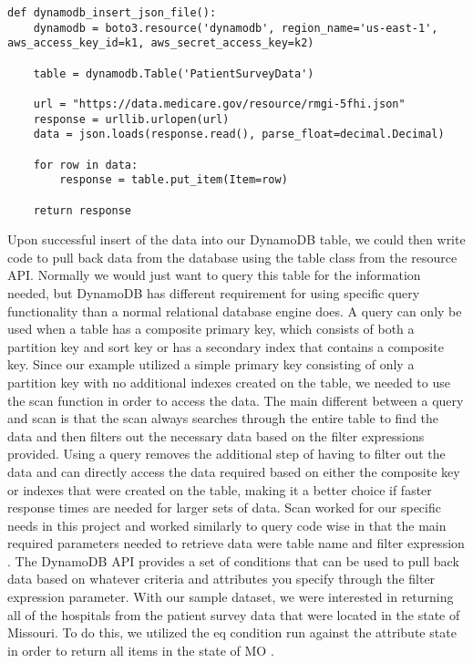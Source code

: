 \begin{verbatim}
def dynamodb_insert_json_file():
    dynamodb = boto3.resource('dynamodb', region_name='us-east-1', aws_access_key_id=k1, aws_secret_access_key=k2)

    table = dynamodb.Table('PatientSurveyData')

    url = "https://data.medicare.gov/resource/rmgi-5fhi.json"
    response = urllib.urlopen(url)
    data = json.loads(response.read(), parse_float=decimal.Decimal)

    for row in data:
        response = table.put_item(Item=row)

    return response
\end{verbatim}

Upon successful insert of the data into our DynamoDB table, we could then write code to pull back data from the database using the table class from the resource API. Normally we would just want to query this table for the information needed, but DynamoDB has different requirement for using specific query functionality than a normal relational database engine does. A query can only be used when a table has a composite primary key, which consists of both a partition key and sort key or has a secondary index that contains a composite key. Since our example utilized a simple primary key consisting of only a partition key with no additional indexes created on the table, we needed to use the scan function in order to access the data. The main different between a query and scan is that the scan always searches through the entire table to find the data and then filters out the necessary data based on the filter expressions provided. Using a query removes the additional step of having to filter out the data and can directly access the data required based on either the composite key or indexes that were created on the table, making it a better choice if faster response times are needed for larger sets of data. Scan worked for our specific needs in this project and worked similarly to query code wise in that the main required parameters needed to retrieve data were table name and filter expression \cite{hid-sp18-521-botodynamodb}. The DynamoDB API provides a set of conditions that can be used to pull back data based on whatever criteria and attributes you specify through the filter expression parameter. With our sample dataset, we were interested in returning all of the hospitals from the patient survey data that were located in the state of Missouri. To do this, we utilized the eq condition run against the attribute state in order to return all items in the state of MO \cite{hid-sp18-boto-dynamodbconditions}.  

